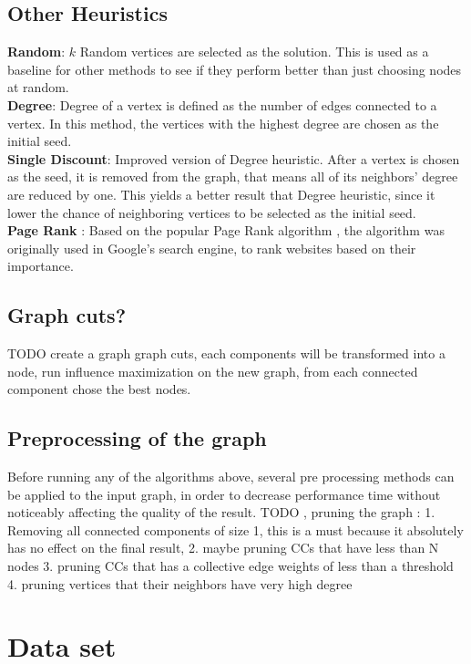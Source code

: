 \documentclass[english]{tktltiki}
\begin{document}
\subsection{Other Heuristics}
\textbf{Random}: $k$ Random vertices are selected as the solution. This is used as a baseline for other methods to see if they perform better than just choosing nodes at random. \\
\textbf{Degree}: Degree of a vertex is defined as the number of edges connected to a vertex. In this method, the vertices with the highest degree are chosen as the initial seed. \\ 
\textbf{Single Discount}: Improved version of Degree heuristic. After a vertex is chosen as the seed, it is removed from the graph, that means all of its neighbors' degree are reduced by one. This yields a better result that Degree heuristic, since it lower the chance of neighboring vertices to be selected as the initial seed. \\ 
\textbf {Page Rank} : Based on the popular Page Rank algorithm \cite{page99}, the algorithm was originally used in Google's search engine, to rank websites based on their importance. 

\subsection{Graph cuts?}
TODO
create a graph graph cuts, each components will be transformed into a node, run influence maximization on the new graph, from each connected component chose the best nodes.

\subsection{Preprocessing of the graph}
Before running any of the algorithms above, several pre processing methods can be applied to the input graph, in order to decrease performance time without noticeably affecting the quality of the result. 
TODO , pruning the graph : 
1. Removing all connected components of size 1, this is a must because it absolutely has no effect on the final result, 
2. maybe pruning CCs that have less than N nodes
3. pruning CCs that has a collective edge weights of less than a threshold
4. pruning vertices that their neighbors have very high degree



\section{Data set}
\end{document}
